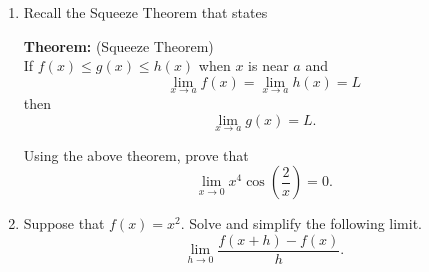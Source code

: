 \documentclass[letterpaper,11pt]{article}
\begin{document}
\begin{enumerate}
\item Recall the Squeeze Theorem that states 

\textbf{Theorem:} (Squeeze Theorem) \\
If $f(x) \leq g(x) \leq h(x)$ when $x$ is near $a$ and 
\[\lim_{x\to a} f(x) = \lim_{x\to a}h(x) = L\]
then
\[\lim_{x\to a}g(x) = L.\]

Using the above theorem, prove that
\[\lim_{x\to 0} x^4 \cos\left(\frac{2}{x}\right) = 0.\]
\vfill
\newpage
\item Suppose that $f(x) = x^2$. Solve and simplify the following limit.
\[\lim_{h \to 0} \frac{f(x+h)-f(x)}{h}.\]
\vfill

\end{enumerate}
\end{document}
